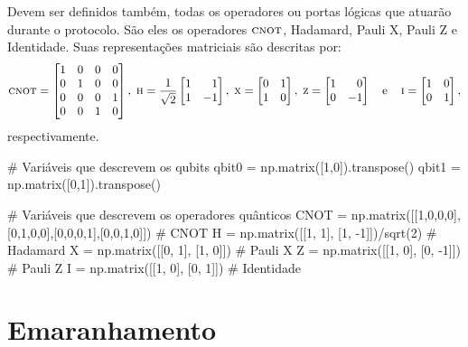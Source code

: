 Devem ser definidos também, todas os operadores ou portas lógicas que atuarão durante o protocolo. São eles os operadores \(\operatorname{\textsc{cnot}}\), Hadamard, Pauli X, Pauli Z e Identidade. Suas representações matriciais são descritas por:
\[ \CNOT =
  \begin{bmatrix}
    1 & 0 & 0 & 0 \\
    0 & 1 & 0 & 0 \\
    0 & 0 & 0 & 1 \\
    0 & 0 & 1 & 0
  \end{bmatrix},\;
  \HAD = \frac{1}{\sqrt{2}} \begin{bmatrix*}[r] 1 & 1 \\ 1 & -1 \end{bmatrix*},\;
  \XXX = \begin{bmatrix} 0 & 1 \\ 1 & 0 \end{bmatrix},\;
  \ZZZ = \begin{bmatrix*}[r] 1 & 0 \\ 0 & -1 \end{bmatrix*} \quad \text{e} \quad
  \III = \begin{bmatrix} 1 & 0 \\ 0 & 1 \end{bmatrix},
\]
respectivamente.
\begin{pycode}
    # Variáveis que descrevem os qubits
    qbit0 = np.matrix([1,0]).transpose()
    qbit1 = np.matrix([0,1]).transpose()

    # Variáveis que descrevem os operadores quânticos
    CNOT = np.matrix([[1,0,0,0],[0,1,0,0],[0,0,0,1],[0,0,1,0]])  # CNOT
    H = np.matrix([[1, 1], [1, -1]])/sqrt(2)  # Hadamard
    X = np.matrix([[0, 1], [1, 0]])           # Pauli X
    Z = np.matrix([[1, 0], [0, -1]])          # Pauli Z
    I = np.matrix([[1, 0], [0, 1]])           # Identidade
\end{pycode}

\section{Emaranhamento}\label{emaranhamento}

